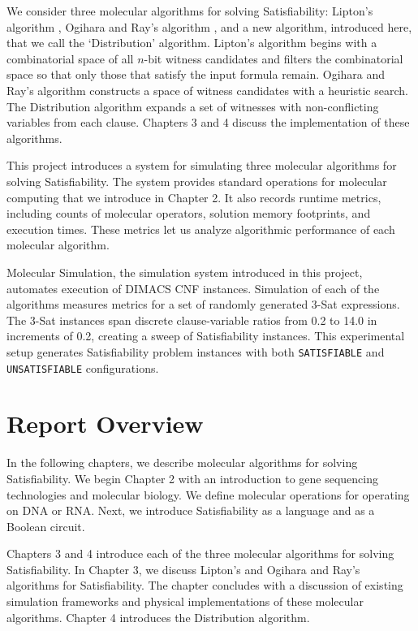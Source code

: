 We consider three molecular algorithms for solving {\sc Satisfiability}: Lipton's algorithm \cite{Lipton95usingdna}, Ogihara and Ray's algorithm \cite{Ogihara:1996:BFS:898228, Ogihara97dna-basedparallel}, and a new algorithm, introduced here, that we call the `Distribution' algorithm.  Lipton's algorithm begins with a combinatorial space of all $n$-bit witness candidates and filters the combinatorial space so that only those that satisfy the input formula remain.  Ogihara and Ray's algorithm constructs a space of witness candidates with a heuristic search.  The Distribution algorithm expands a set of witnesses with non-conflicting variables from each clause.  Chapters 3 and 4 discuss the implementation of these algorithms.

This project introduces a system for simulating three molecular algorithms for solving {\sc Satisfiability}.  The system provides standard operations for molecular computing that we introduce in Chapter 2.  It also records runtime metrics, including counts of molecular operators, solution memory footprints, and execution times.  These metrics let us analyze algorithmic performance of each molecular algorithm.

Molecular Simulation, the simulation system introduced in this project, automates execution of DIMACS CNF instances.  Simulation of each of the algorithms measures metrics for a set of randomly generated $3$-{\sc Sat} expressions.  The $3$-{\sc Sat} instances span discrete clause-variable ratios from 0.2 to 14.0 in increments of 0.2, creating a sweep of {\sc Satisfiability} instances.  This experimental setup generates {\sc Satisfiability} problem instances with both \texttt{SATISFIABLE} and \texttt{UNSATISFIABLE} configurations.

\section{Report Overview}

In the following chapters, we describe molecular algorithms for solving {\sc Satisfiability}.  We begin Chapter 2 with an introduction to gene sequencing technologies and molecular biology.  We define molecular operations for operating on DNA or RNA.  Next, we introduce {\sc Satisfiability} as a language and as a Boolean circuit.

Chapters 3 and 4 introduce each of the three molecular algorithms for solving {\sc Satisfiability}.  In Chapter 3, we discuss Lipton's \cite{Lipton95usingdna, dnaComputingModels2008} and Ogihara and Ray's \cite{Ogihara:1996:BFS:898228, Ogihara97dna-basedparallel, dnaBasedImplemetation_Yoshida2000} algorithms for {\sc Satisfiability}.  The chapter concludes with a discussion of existing simulation frameworks and physical implementations of these molecular algorithms.  Chapter 4 introduces the Distribution algorithm.

